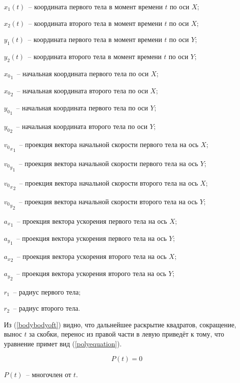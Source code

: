 \begin{Underequation}
  \(x_1(t)\)~-- координата первого тела в момент времени \(t\) по оси \(X\);

  \(x_2(t)\)~-- координата второго тела в момент времени \(t\) по оси \(X\);

  \(y_1(t)\)~-- координата первого тела в момент времени \(t\) по оси \(Y\);

  \(y_2(t)\)~-- координата второго тела в момент времени \(t\) по оси \(Y\);

  \({x_0}_1\)~-- начальная координата первого тела по оси \(X\);

  \({x_0}_2\)~-- начальная координата второго тела по оси \(X\);

  \({y_0}_1\)~-- начальная координата первого тела по оси \(Y\);

  \({y_0}_2\)~-- начальная координата второго тела по оси \(Y\);

  \({{v_0}_x}_1\)~-- проекция вектора начальной скорости первого тела на ось \(X\);

  \({{v_0}_y}_1\)~-- проекция вектора начальной скорости первого тела на ось \(Y\);

  \({{v_0}_x}_2\)~-- проекция вектора начальной скорости второго тела на ось \(X\);

  \({{v_0}_y}_2\)~-- проекция вектора начальной скорости второго тела на ось \(Y\);

  \({a_x}_1\)~-- проекция вектора ускорения первого тела на ось \(X\);

  \({a_y}_1\)~-- проекция вектора ускорения первого тела на ось \(Y\);

  \({a_x}_2\)~-- проекция вектора ускорения второго тела на ось \(X\);

  \({a_y}_2\)~-- проекция вектора ускорения второго тела на ось \(Y\);

  \(r_1\)~-- радиус первого тела;

  \(r_2\)~-- радиус второго тела.
\end{Underequation}

Из (\ref{bodybodyoft}) видно, что дальнейшее раскрытие квадратов, сокращение, вынос \(t\) за скобки,
перенос из правой части в левую приведёт к тому, что уравнение примет вид (\ref{polyequation}).

\begin{equation}\label{polyequation}
  P(t) = 0
\end{equation}

\begin{Underequation}
  \(P(t)\)~-- многочлен от \(t\).
\end{Underequation}

